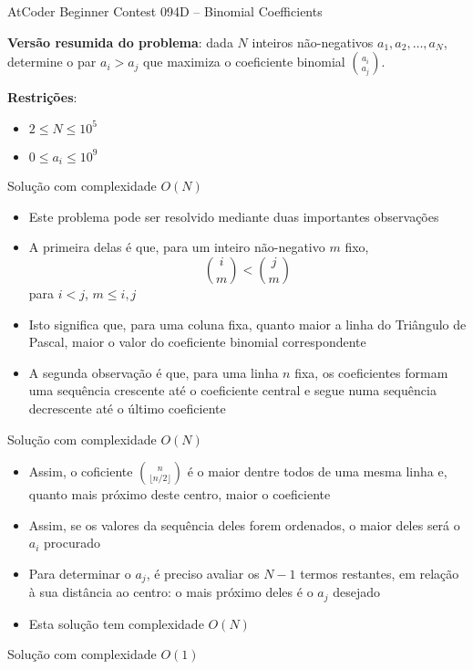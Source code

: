 \begin{frame}[fragile]{AtCoder Beginner Contest 094D -- Binomial Coefficients}

    \textbf{Versão resumida do problema}: dada $N$ inteiros não-negativos $a_1, a_2, \ldots, a_N$,
        determine o par $a_i > a_j$ que maximiza o coeficiente binomial $\binom{a_i}{a_j}$.

    \vspace{0.1in}
    \textbf{Restrições}:
    \begin{itemize}
        \item $2\leq N\leq 10^5$
        \item $0\leq a_i\leq 10^9$
    \end{itemize}
\end{frame}

\begin{frame}[fragile]{Solução com complexidade $O(N)$}

    \begin{itemize}
        \item Este problema pode ser resolvido mediante duas importantes observações

        \item A primeira delas é que, para um inteiro não-negativo $m$ fixo,
        $$
            \binom{i}{m} < \binom{j}{m}
        $$
        para $i < j$, $m \leq i, j$

        \item Isto significa que, para uma coluna fixa, quanto maior a linha do Triângulo de
            Pascal, maior o valor do coeficiente binomial correspondente

        \item A segunda observação é que, para uma linha $n$ fixa, os coeficientes formam uma
            sequência crescente até o coeficiente central e segue numa sequência decrescente
            até o último coeficiente
    \end{itemize}

\end{frame}

\begin{frame}[fragile]{Solução com complexidade $O(N)$}

    \begin{itemize}
        \item Assim, o coficiente $\binom{n}{\lfloor n/2\rfloor}$ é o maior dentre todos de uma
            mesma linha e, quanto mais próximo deste centro, maior o coeficiente

        \item Assim, se os valores da sequência deles forem ordenados, o maior deles será o $a_i$
            procurado

        \item Para determinar o $a_j$, é preciso avaliar os $N - 1$ termos restantes, em relação
            à sua distância ao centro: o mais próximo deles é o $a_j$ desejado

        \item Esta solução tem complexidade $O(N)$
    \end{itemize}

\end{frame}

\begin{frame}[fragile]{Solução com complexidade $O(1)$}
\end{frame}
